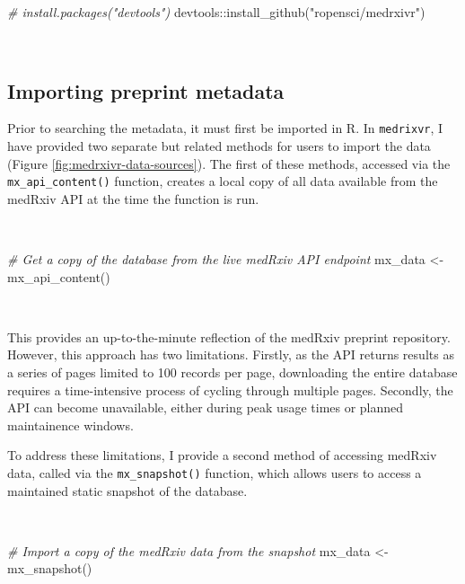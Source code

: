 \documentclass[a4paper, twoside]{templates/ociamthesis}
\newenvironment{Shaded}{\begin{snugshade}}{\end{snugshade}}
\newcommand{\CommentTok}[1]{\textcolor[rgb]{0.56,0.35,0.01}{\textit{#1}}}
\newcommand{\FunctionTok}[1]{\textcolor[rgb]{0.00,0.00,0.00}{#1}}
\newcommand{\NormalTok}[1]{#1}
\newcommand{\OtherTok}[1]{\textcolor[rgb]{0.56,0.35,0.01}{#1}}
\newcommand{\SpecialCharTok}[1]{\textcolor[rgb]{0.00,0.00,0.00}{#1}}
\newcommand{\StringTok}[1]{\textcolor[rgb]{0.31,0.60,0.02}{#1}}
\renewenvironment{Shaded}
{
  \vspace{4pt}%
  \begin{snugshade}%
}{%
  \end{snugshade}%
  \vspace{4pt}%
}
\begin{document}
\begin{Shaded}
\begin{Highlighting}[]
\CommentTok{\# install.packages("devtools") }
\NormalTok{devtools}\SpecialCharTok{::}\FunctionTok{install\_github}\NormalTok{(}\StringTok{"ropensci/medrxivr"}\NormalTok{)}
\end{Highlighting}
\end{Shaded}

~

\hypertarget{importing-preprint-metadata}{%
\subsection{Importing preprint metadata}\label{importing-preprint-metadata}}

Prior to searching the metadata, it must first be imported in R. In \texttt{medrixvr}, I have provided two separate but related methods for users to import the data (Figure \ref{fig:medrxivr-data-sources}). The first of these methods, accessed via the \texttt{mx\_api\_content()} function, creates a local copy of all data available from the medRxiv API at the time the function is run.

~

\begin{Shaded}
\begin{Highlighting}[]
\CommentTok{\# Get a copy of the database from the live medRxiv API endpoint}
\NormalTok{mx\_data }\OtherTok{\textless{}{-}} \FunctionTok{mx\_api\_content}\NormalTok{()}
\end{Highlighting}
\end{Shaded}

~

This provides an up-to-the-minute reflection of the medRxiv preprint repository. However, this approach has two limitations. Firstly, as the API returns results as a series of pages limited to 100 records per page, downloading the entire database requires a time-intensive process of cycling through multiple pages. Secondly, the API can become unavailable, either during peak usage times or planned maintainence windows.

To address these limitations, I provide a second method of accessing medRxiv data, called via the \texttt{mx\_snapshot()} function, which allows users to access a maintained static snapshot of the database.

~

\begin{Shaded}
\begin{Highlighting}[]
\CommentTok{\# Import a copy of the medRxiv data from the snapshot}
\NormalTok{mx\_data }\OtherTok{\textless{}{-}} \FunctionTok{mx\_snapshot}\NormalTok{()}
\end{Highlighting}
\end{Shaded}
\end{document}
